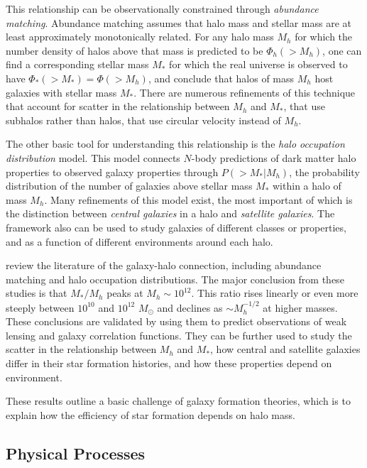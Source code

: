This relationship can be observationally constrained through {\it
  abundance matching}. Abundance matching assumes that halo mass and
stellar mass are at least approximately monotonically related. For any
halo mass $M_h$ for which the number density of halos above that mass
is predicted to be $\Phi_h(>M_h)$, one can find a corresponding
stellar mass $M_\ast$ for which the real universe is observed to have
$\Phi_\ast(>M_\ast) = \Phi(>M_h)$, and conclude that halos of mass
$M_h$ host galaxies with stellar mass $M_\ast$. There are numerous
refinements of this technique that account for scatter in the
relationship between $M_h$ and $M_\ast$, that use subhalos rather than
halos, that use circular velocity instead of $M_h$.

The other basic tool for understanding this relationship is the {\it
  halo occupation distribution} model. This model connects $N$-body
predictions of dark matter halo properties to observed galaxy
properties through $P(>M_\ast | M_h)$, the probability distribution of
the number of galaxies above stellar mass $M_\ast$ within a halo of
mass $M_h$. Many refinements of this model exist, the most important
of which is the distinction between {\it central galaxies} in a halo
and {\it satellite galaxies}. The framework also can be used to study
galaxies of different classes or properties, and as a function of
different environments around each halo.

\citet{wechsler18a} review the literature of the galaxy-halo
connection, including abundance matching and halo occupation
distributions. The major conclusion from these studies is that
$M_\ast/M_h$ peaks at $M_h\sim 10^{12}$. This ratio rises linearly or
even more steeply between $10^{10}$ and $10^{12}$ $M_\odot$ and
declines as $\sim M_h^{-1/2}$ at higher masses. These conclusions are
validated by using them to predict observations of weak lensing and
galaxy correlation functions. They can be further used to study the
scatter in the relationship between $M_h$ and $M_\ast$, how central
and satellite galaxies differ in their star formation histories, and
how these properties depend on environment.

These results outline a basic challenge of galaxy formation theories,
which is to explain how the efficiency of star formation depends on halo
mass.

\subsection{Physical Processes}

